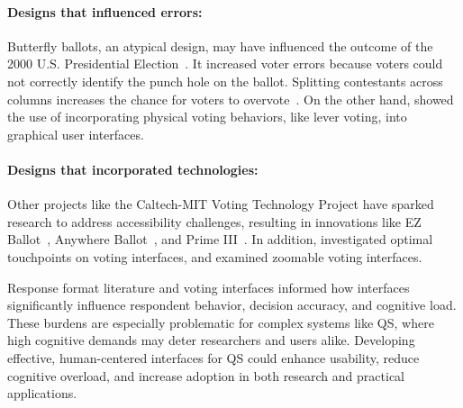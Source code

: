 \paragraph{Designs that influenced errors: } Butterfly ballots, an atypical design, may have influenced the outcome of the 2000 U.S. Presidential Election~\cite{wandButterflyDidIt2001}. It increased voter errors because voters could not correctly identify the punch hole on the ballot. Splitting contestants across columns increases the chance for voters to overvote~\cite{quesenberyOpinionGoodDesign2020}. On the other hand, \textcite{everettElectronicVotingMachines2008} showed the use of incorporating physical voting behaviors, like lever voting, into graphical user interfaces.

\paragraph{Designs that incorporated technologies: } Other projects like the Caltech-MIT Voting Technology Project have sparked research to address accessibility challenges, resulting in innovations like EZ Ballot~\cite{leeUniversalDesignBallot2016}, Anywhere Ballot~\cite{summers2014making}, and Prime III~\cite{dawkinsPrimeIIIInnovative2009}. In addition, \textcite{gilbertAnomalyDetectionElectronic2013} investigated optimal touchpoints on voting interfaces, and \textcite{conradElectronicVotingEliminates2009} examined zoomable voting interfaces.

Response format literature and voting interfaces informed how interfaces significantly influence respondent behavior, decision accuracy, and cognitive load. These burdens are especially problematic for complex systems like QS, where high cognitive demands may deter researchers and users alike. Developing effective, human-centered interfaces for QS could enhance usability, reduce cognitive overload, and increase adoption in both research and practical applications.
